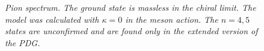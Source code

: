\begin{figure}
\caption{\textit{Pion spectrum. The ground state is massless in the chiral limit. The model was calculated with $\kappa=0$ in the meson action. The $n=4,5$ states are unconfirmed and are found only in the extended version of the PDG.}}
\end{figure}




